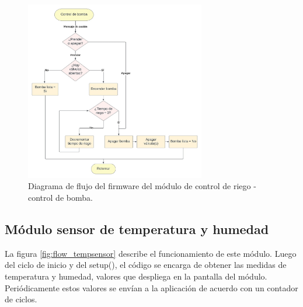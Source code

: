 \begin{figure}[!h]
	\centering
	\includegraphics[width=0.7\textwidth]{./Figures/chapter3/FirmwarePumpControl.jpg}
	\caption[Diagrama de flujo del firmware del módulo de control de riego - control de bomba]{Diagrama de flujo del firmware del módulo de control de riego - control de bomba.}
	\label{fig:flow_bombacontrol}
\end{figure}







\pagebreak
\subsection{Módulo sensor de temperatura y humedad}
\label{Módulo sensor de temperatura y humedad}

La figura \ref{fig:flow_tempsensor} describe el funcionamiento de este módulo. Luego del ciclo de inicio y del setup(), el código se encarga de obtener las medidas de temperatura y humedad, valores que despliega en la pantalla del módulo. Periódicamente estos valores se envían a la aplicación de acuerdo con un contador de ciclos. 



